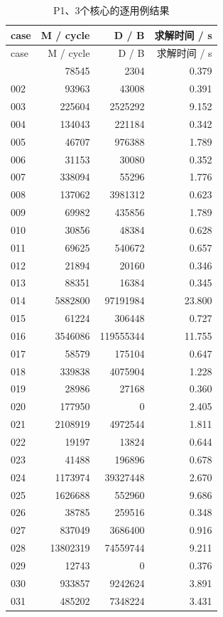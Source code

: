 \documentclass[anonymous,notoc]{gmcm2026}
\begin{document}
\begin{longtable}{lrrr}
\caption{P1、3个核心的逐用例结果}\\
\toprule
case & M / cycle & D / B & 求解时间 / s\\\midrule
\endfirsthead
\toprule
case & M / cycle & D / B & 求解时间 / s\\\midrule
\endhead
\bottomrule\endfoot
001 & 78545 & 2304 & 0.379 \\
002 & 93963 & 43008 & 0.391 \\
003 & 225604 & 2525292 & 9.152 \\
004 & 134043 & 221184 & 0.342 \\
005 & 46707 & 976388 & 1.789 \\
006 & 31153 & 30080 & 0.352 \\
007 & 338094 & 55296 & 1.776 \\
008 & 137062 & 3981312 & 0.623 \\
009 & 69982 & 435856 & 1.789 \\
010 & 30856 & 48384 & 0.628 \\
011 & 69625 & 540672 & 0.657 \\
012 & 21894 & 20160 & 0.346 \\
013 & 88351 & 16384 & 0.345 \\
014 & 5882800 & 97191984 & 23.800 \\
015 & 61224 & 306448 & 0.727 \\
016 & 3546086 & 119555344 & 11.755 \\
017 & 58579 & 175104 & 0.647 \\
018 & 339838 & 4075904 & 1.228 \\
019 & 28986 & 27168 & 0.360 \\
020 & 177950 & 0 & 2.405 \\
021 & 2108919 & 4972544 & 1.811 \\
022 & 19197 & 13824 & 0.644 \\
023 & 41488 & 196896 & 0.678 \\
024 & 1173974 & 39327448 & 2.670 \\
025 & 1626688 & 552960 & 9.686 \\
026 & 38785 & 259516 & 0.348 \\
027 & 837049 & 3686400 & 0.916 \\
028 & 13802319 & 74559744 & 9.211 \\
029 & 12743 & 0 & 0.376 \\
030 & 933857 & 9242624 & 3.891 \\
031 & 485202 & 7348224 & 3.431 \\

\end{longtable}
\end{document}
